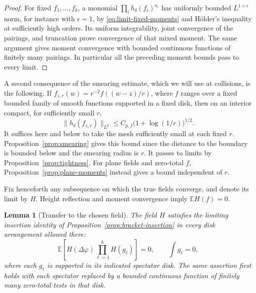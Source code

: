 \documentclass[11pt]{article}
\newcommand{\E}{\mathbb E}
\newtheorem{lemma}[theorem]{Lemma}
\theoremstyle{definition}
\theoremstyle{remark}
\numberwithin{equation}{section}
\begin{document}
\begin{proof}
For fixed \(f_1,\ldots,f_k\), a monomial
\(\prod_i h_\delta(f_i)^{a_i}\) has uniformly bounded \(L^{1+\epsilon}\)
norm, for instance with \(\epsilon=1\), by
\eqref{eq:limit-fixed-moments} and H\"older's inequality at sufficiently
high orders.  Its uniform integrability, joint convergence of the
pairings, and truncation prove convergence of that mixed moment.
The same argument gives moment convergence with bounded continuous
functions of finitely many pairings.  In particular all the preceding
moment bounds pass to every limit.
\end{proof}

A second consequence of the smearing estimate, which we will use at
collisions, is the following.  If
\(f_{z,r}(w)=r^{-2}f((w-z)/r)\), where \(f\) ranges over a fixed bounded
family of smooth functions supported in a fixed disk, then on an
interior compact, for sufficiently small \(r\),
\begin{equation}
 \|h_\delta(f_{z,r})\|_{L^p}
 \le C_{p,f}\bigl(1+\log(1/r)\bigr)^{1/2}.
 \label{eq:limit-small-moments}
\end{equation}
It suffices here and below to take the mesh sufficiently small at each
fixed \(r\).  Proposition~\ref{prop:smearing} gives this bound since
the distance to the boundary is bounded below and the smearing radius
is \(r\).  It passes to limits by Proposition~\ref{prop:tightness}.
For plane fields and zero-total \(f\), Proposition~\ref{prop:plane-moments}
instead gives a bound independent of \(r\).

Fix henceforth any subsequence on which the true fields converge,
and denote its limit by \(H\).  Height reflection and moment
convergence imply \(\E H(f)=0\).

\begin{lemma}[Transfer to the chosen field]
\label{limit:transfer}
The field \(H\) satisfies the limiting insertion identity of
Proposition~\ref{prop:bracket-insertion} in every disk arrangement
allowed there:
\begin{equation}
 \E\left[H(\Delta\varphi)
          \prod_{\ell=1}^k H(g_\ell)\right]=0,
 \qquad \int g_\ell=0,
 \label{eq:limit-insertion}
\end{equation}
where each \(g_\ell\) is supported in its indicated spectator disk.
The same assertion first holds with each spectator replaced by a
bounded continuous function of finitely many zero-total tests in that
disk.
\end{lemma}
\end{document}
